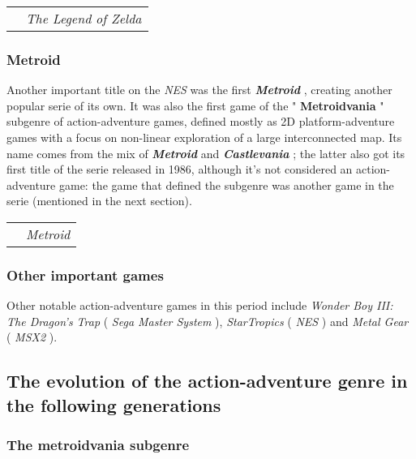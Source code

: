 \documentclass[a4paper,10pt]{book}
\begin{document}
 
 \begin{longtable}{p{1mm}|l|}\hline
 
 & 
 \\\hline
 
 & \textit{The Legend of Zelda }
 \\\hline
 \end{longtable}
 
 \subsubsection{Metroid }
 
 
          Another important title on the  \textit{NES } was the first  \textbf{\textit{Metroid }} , creating another popular serie of its own. It was also the first game of the " \textbf{Metroidvania } " subgenre of action-adventure games,
          defined mostly as 2D platform-adventure games with a focus on non-linear exploration of a large interconnected map. Its name comes from the mix of  \textbf{\textit{Metroid }}  and  \textbf{\textit{Castlevania }} ;
          the latter also got its first title of the serie released in 1986, although it's not considered an action-adventure game: the game that defined the subgenre was another game in the serie (mentioned in the next section). 
 
 
 \begin{longtable}{p{1mm}|l|}\hline
 
 & 
 \\\hline
 
 & \textit{Metroid }
 \\\hline
 \end{longtable}
 
 \subsubsection{Other important games }
 
 
          Other notable action-adventure games in this period include  \textit{Wonder Boy III: The Dragon's Trap } ( \textit{Sega Master System }),  \textit{StarTropics } ( \textit{NES }) and  \textit{Metal Gear } ( \textit{MSX2 }).
         
 
 \subsection{The evolution of the action-adventure genre in the following generations }
 
 \subsubsection{The metroidvania subgenre }
 
\end{document}
